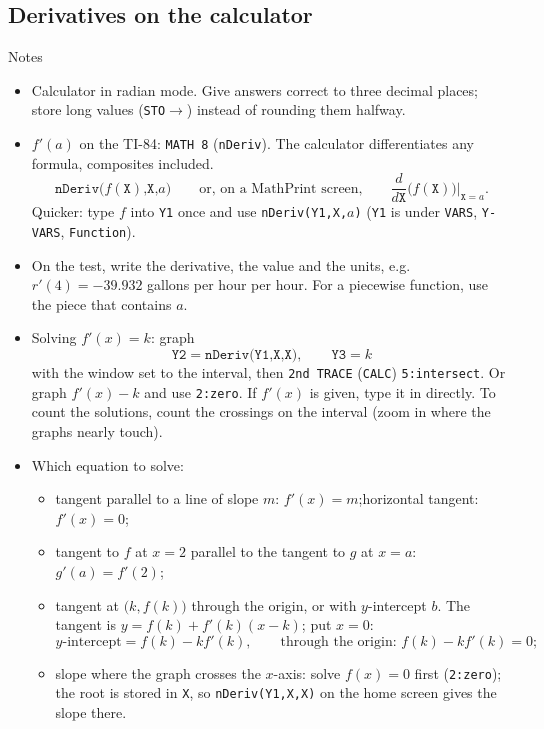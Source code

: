 \documentclass[11pt,a4paper]{article}
\begin{document}
\subsection{Derivatives on the calculator}
\begin{notesbox}{Notes}
\begin{itemize}
 \item Calculator in radian mode. Give answers correct to three decimal places; store long values (\texttt{STO}$\to$) instead of rounding them halfway.
 \item $f'(a)$ on the TI-84: \texttt{MATH 8} (\texttt{nDeriv}). The calculator differentiates any formula, composites included.
 \[
 \texttt{nDeriv(}f(\texttt{X})\texttt{,X,}a\texttt{)}\qquad\text{or, on a MathPrint screen,}\qquad \frac{d}{d\texttt{X}}\bigl(f(\texttt{X})\bigr)\Big|_{\texttt{X}=a}.
 \]
 Quicker: type $f$ into \texttt{Y1} once and use \texttt{nDeriv(Y1,X,}$a$\texttt{)} (\texttt{Y1} is under \texttt{VARS}, \texttt{Y-VARS}, \texttt{Function}).
 \item On the test, write the derivative, the value and the units, e.g.\ $r'(4)=-39.932$ gallons per hour per hour. For a piecewise function, use the piece that contains $a$.
 \item Solving $f'(x)=k$: graph
 \[
 \texttt{Y2}=\texttt{nDeriv(Y1,X,X)},\qquad \texttt{Y3}=k
 \]
 with the window set to the interval, then \texttt{2nd TRACE} (\texttt{CALC}) \texttt{5:intersect}. Or graph $f'(x)-k$ and use \texttt{2:zero}. If $f'(x)$ is given, type it in directly. To count the solutions, count the crossings on the interval (zoom in where the graphs nearly touch).
 \item Which equation to solve:
 \begin{itemize}
  \item tangent parallel to a line of slope $m$: $f'(x)=m$;\quad horizontal tangent: $f'(x)=0$;
  \item tangent to $f$ at $x=2$ parallel to the tangent to $g$ at $x=a$: $g'(a)=f'(2)$;
  \item tangent at $\bigl(k,f(k)\bigr)$ through the origin, or with $y$-intercept $b$. The tangent is $y=f(k)+f'(k)(x-k)$; put $x=0$:
  \[
  y\text{-intercept}=f(k)-kf'(k),\qquad \text{through the origin: } f(k)-kf'(k)=0;
  \]
  \item slope where the graph crosses the $x$-axis: solve $f(x)=0$ first (\texttt{2:zero}); the root is stored in \texttt{X}, so \texttt{nDeriv(Y1,X,X)} on the home screen gives the slope there.
 \end{itemize}
\end{itemize}
\end{notesbox}
\end{document}
